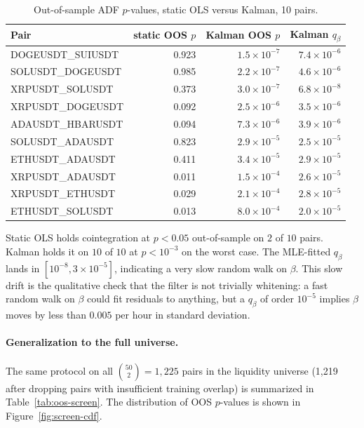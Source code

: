 \documentclass[11pt]{article}
\begin{document}
\begin{table}[h]
\centering
\caption{Out-of-sample ADF $p$-values, static OLS versus Kalman, 10 pairs.}
\label{tab:oos-10}
\small
\begin{tabular}{lrrr}
\toprule
Pair & static OOS $p$ & Kalman OOS $p$ & Kalman $q_\beta$ \\
\midrule
DOGEUSDT\_SUIUSDT  & 0.923 & $1.5 \times 10^{-7}$ & $7.4 \times 10^{-6}$ \\
SOLUSDT\_DOGEUSDT  & 0.985 & $2.2 \times 10^{-7}$ & $4.6 \times 10^{-6}$ \\
XRPUSDT\_SOLUSDT   & 0.373 & $3.0 \times 10^{-7}$ & $6.8 \times 10^{-8}$ \\
XRPUSDT\_DOGEUSDT  & 0.092 & $2.5 \times 10^{-6}$ & $3.5 \times 10^{-6}$ \\
ADAUSDT\_HBARUSDT  & 0.094 & $7.3 \times 10^{-6}$ & $3.9 \times 10^{-6}$ \\
SOLUSDT\_ADAUSDT   & 0.823 & $2.9 \times 10^{-5}$ & $2.5 \times 10^{-5}$ \\
ETHUSDT\_ADAUSDT   & 0.411 & $3.4 \times 10^{-5}$ & $2.9 \times 10^{-5}$ \\
XRPUSDT\_ADAUSDT   & 0.011 & $1.5 \times 10^{-4}$ & $2.6 \times 10^{-5}$ \\
XRPUSDT\_ETHUSDT   & 0.029 & $2.1 \times 10^{-4}$ & $2.8 \times 10^{-5}$ \\
ETHUSDT\_SOLUSDT   & 0.013 & $8.0 \times 10^{-4}$ & $2.0 \times 10^{-5}$ \\
\bottomrule
\end{tabular}
\end{table}

Static OLS holds cointegration at $p < 0.05$ out-of-sample on $2$ of
$10$ pairs. Kalman holds it on $10$ of $10$ at $p < 10^{-3}$ on the
worst case. The MLE-fitted $q_\beta$ lands in $[10^{-8}, 3 \times 10^{-5}]$,
indicating a very slow random walk on $\beta$. This slow drift is the
qualitative check that the filter is not trivially whitening: a fast
random walk on $\beta$ could fit residuals to anything, but a $q_\beta$
of order $10^{-5}$ implies $\beta$ moves by less than $0.005$ per
hour in standard deviation.

\paragraph{Generalization to the full universe.} The same protocol on
all $\binom{50}{2} = 1{,}225$ pairs in the liquidity universe (1{,}219
after dropping pairs with insufficient training overlap) is summarized
in Table~\ref{tab:oos-screen}. The distribution of OOS $p$-values is
shown in Figure~\ref{fig:screen-cdf}.
\end{document}
